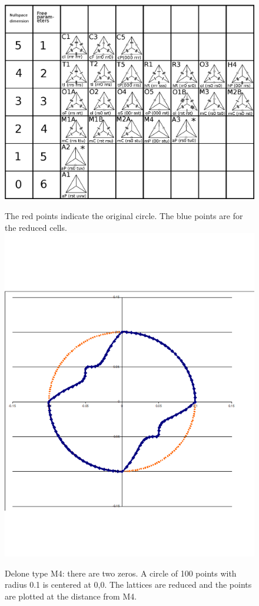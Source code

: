 \documentclass[preprint]{iucr}              %
\begin{document}
\begin{figure}
	\caption{}
	\label{fig:degenerate}
	\includegraphics[width=12cm]{NullSpaceDistribution}
\end{figure}

\begin{figure}
	\label{fig:M4}
	\caption{Delone type M4: there are two zeros. A circle of 100 points with
		radius 0.1 is centered at 0,0. The lattices are reduced and the points are
		plotted at the distance from M4.} The red points indicate the original
	circle. The blue points are for the reduced cells.
	\includegraphics[width=12cm]{M4-100-2-zeros}
\end{figure}
\end{document}
